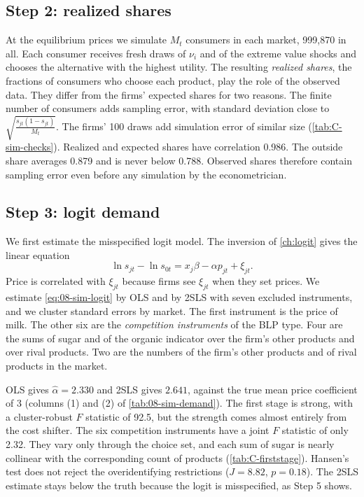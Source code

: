 \subsection{Step 2: realized shares}\label{sec:08-worked-shares}

At the equilibrium prices we simulate $M_t$ consumers in each market, 999,870 in all. Each consumer receives fresh draws
of $\nu_i$ and of the extreme value shocks and chooses the alternative with the highest utility. The resulting
\emph{realized shares}, the fractions of consumers who choose each product, play the role of the observed data. They
differ from the firms' expected shares for two reasons. The finite number of consumers adds sampling error, with
standard deviation close to $\sqrt{\frac{s_{jt}(1 - s_{jt})}{M_t}}$. The firms' 100 draws add simulation error of
similar size (\cref{tab:C-sim-checks}). Realized and expected shares have correlation 0.986. The outside share averages 0.879 and is
never below 0.788. Observed shares therefore contain sampling error even before any simulation by the econometrician.

\subsection{Step 3: logit demand}\label{sec:08-worked-logit}

We first estimate the misspecified logit model. The inversion of \cref{ch:logit} gives the linear equation
\begin{equation}\label{eq:08-sim-logit}
  \ln s_{jt} - \ln s_{0t} = x_j\beta - \alpha p_{jt} + \xi_{jt}.
\end{equation}
Price is correlated with $\xi_{jt}$ because firms see $\xi_{jt}$ when they set prices. We estimate \eqref{eq:08-sim-logit}
by OLS and by 2SLS with seven excluded instruments, and we cluster standard errors by market. The first instrument is
the price of milk. The other six are the \emph{competition instruments} of the BLP type. Four are the sums of sugar and
of the organic indicator over the firm's other products and over rival products. Two are the numbers of the firm's
other products and of rival products in the market.

OLS gives $\hat\alpha = 2.330$ and 2SLS gives $2.641$, against the true mean price coefficient of 3 (columns (1) and
(2) of \cref{tab:08-sim-demand}). The first stage is strong, with a cluster-robust $F$ statistic of 92.5, but the
strength comes almost entirely from the cost shifter. The six competition instruments have a joint $F$ statistic of
only 2.32. They vary only through the choice set, and each sum of sugar is nearly collinear with the corresponding count
of products (\cref{tab:C-firststage}). Hansen's test does not reject the overidentifying restrictions ($J = 8.82$,
$p = 0.18$). The 2SLS estimate stays below the truth because the logit is misspecified, as Step 5 shows.

